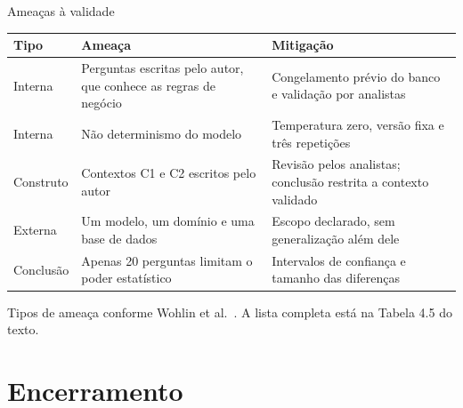 \documentclass[aspectratio=169,10pt]{beamer}
\newcommand{\cab}[1]{\textcolor{UnBAzul}{\textbf{#1}}}
\begin{document}
\begin{frame}{Ameaças à validade}
  \small
  \begin{tabular}{@{}lL{58mm}L{60mm}@{}}
    \toprule
    \cab{Tipo} & \cab{Ameaça} & \cab{Mitigação}\\
    \midrule
    Interna & Perguntas escritas pelo autor, que conhece as regras de negócio &
      Congelamento prévio do banco e validação por analistas\\
    Interna & Não determinismo do modelo &
      Temperatura zero, versão fixa e três repetições\\
    Construto & Contextos C1 e C2 escritos pelo autor &
      Revisão pelos analistas; conclusão restrita a contexto validado\\
    Externa & Um modelo, um domínio e uma base de dados &
      Escopo declarado, sem generalização além dele\\
    Conclusão & Apenas 20 perguntas limitam o poder estatístico &
      Intervalos de confiança e tamanho das diferenças\\
    \bottomrule
  \end{tabular}
  \vspace{3mm}

  {\footnotesize\color{UnBCinza}Tipos de ameaça conforme Wohlin et al.~\cite{wohlin2012}. A lista completa está na Tabela 4.5 do texto.}
\end{frame}

\section{Encerramento}
\end{document}
